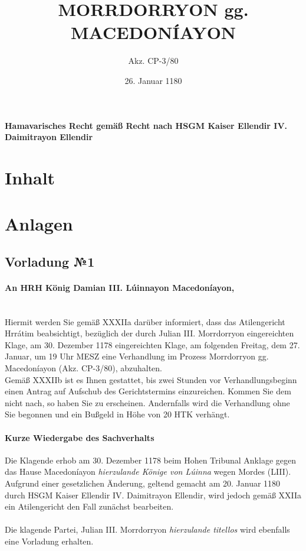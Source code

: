 \documentclass{article}
\title{MORRDORRYON gg. MACEDONÍAYON}
\author{Akz. CP-3/80}
\date{26. Januar 1180}
\begin{document}
\maketitle
\vspace*{\fill}
\paragraph{Hamavarisches Recht gemäß Recht nach HSGM Kaiser Ellendir IV. Daimitrayon Ellendir}
\newpage
\section{Inhalt}
\section{Anlagen}
\subsection{Vorladung №1}
\paragraph{An HRH König Damian III. Lúinnayon Macedoníayon,\\\\}
Hiermit werden Sie gemäß XXXIIa darüber informiert, dass das Atilengericht Hrrátim beabsichtigt, bezüglich der durch Julian III. Morrdorryon eingereichten Klage, 
am 30. Dezember 1178 eingereichten Klage, am folgenden Freitag, dem 27. Januar, um 19 Uhr MESZ eine Verhandlung im Prozess Morrdorryon gg.
Macedoníayon (Akz. CP-3/80), abzuhalten.\\
Gemäß XXXIIb ist es Ihnen gestattet, bis zwei Stunden vor Verhandlungsbeginn einen Antrag auf Aufschub des Gerichtstermins einzureichen.
Kommen Sie dem nicht nach, so haben Sie zu erscheinen. Andernfalls wird die Verhandlung ohne Sie begonnen und ein Bußgeld in Höhe von 20
HTK verhängt.
\paragraph{Kurze Wiedergabe des Sachverhalts\\}
Die Klagende erhob am 30. Dezember 1178 beim Hohen Tribunal Anklage gegen das Hause Macedoníayon \textit{hierzulande Könige von Lúinna} wegen Mordes
(LIII). Aufgrund einer gesetzlichen Änderung, geltend gemacht am 20. Januar 1180 durch HSGM Kaiser Ellendir IV. Daimitrayon Ellendir, wird jedoch gemäß 
XXIIa ein Atilengericht den Fall zunächst bearbeiten.\\\\
Die klagende Partei, Julian III. Morrdorryon \textit{hierzulande titellos} wird ebenfalls eine Vorladung erhalten.
\end{document}

